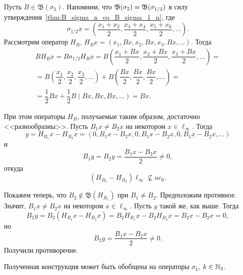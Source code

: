 \begin{example}
	Пусть $B\in\mathfrak B(\sigma_2)$.
	Напомним, что $\mathfrak{B}(\sigma_2) = \mathfrak{B}(\sigma_{1/2})$ в силу утверждения~\ref{thm:B_sigma_n_eq_B_sigma_1_n}, где
	\begin{equation}
		\sigma_{1/2} x = \left(\dfrac{x_1+x_2}2, \dfrac{x_3+x_4}2, \dfrac{x_5+x_6}2, ...\right)
		.
	\end{equation}
	Рассмотрим оператор $H_B$, $H_Bx = (x_1, Bx, x_2, Bx, x_3, Bx, ...)$.
	Тогда
	\begin{multline}
		B H_B x = B \sigma_{1/2} H_B x = B\left(\dfrac{x_1+Bx}2, \dfrac{x_2+Bx}2, \dfrac{x_3+Bx}2, ...\right) =
		\\=
		B\left(\dfrac{x_1}2, \dfrac{x_2}2, \dfrac{x_3}2, ...\right) + B\left(\dfrac{Bx}2, \dfrac{Bx}2, \dfrac{Bx}2, ...\right)=
		\\=
		\dfrac12 Bx + \dfrac12 B\left(Bx, Bx, Bx, ...\right) = Bx
		.
	\end{multline}

	При этом операторы $H_B$, получаемые таким образом, достаточно <<разнообразны>>.
	Пусть $B_1 x \ne B_2 x$ на некотором $x\in \ell_\infty$.
	Тогда
	\begin{equation}
		y = H_{B_1} x - H_{B_2} x = (0, B_1 x - B_2 x, 0, B_1 x - B_2 x, 0, B_1 x - B_2 x, ...)
	\end{equation}
	 и
	\begin{equation}
		B_1y = B_2y = \dfrac{B_1 x - B_2 x}2\ne 0
		,
	\end{equation}
	откуда
	\begin{equation}
		(H_{B_1} - H_{B_2})\ell_\infty \not\subseteq ac_0
		.
	\end{equation}


	Покажем  теперь, что $B_2 \notin \mathfrak B (H_{B_1})$ при $B_1 \ne B_2$. Предположим противное. Значит, $B_1 x \ne B_2 x$ на некотором $x\in \ell_\infty$. Пусть $y$ такой же, как выше. Тогда
	\begin{equation}
		B_2 y = B_2(H_{B_1} x - H_{B_2} x) = B_2 H_{B_1} x - B_2 H_{B_2} x = B_2 x - B_2 x = 0
		,
	\end{equation}
	но
	\begin{equation}
		B_2 y = \dfrac{B_1x - B_2 x}{2} \ne 0
		.
	\end{equation}
	Получили противоречие.
\end{example}

Полученная конструкция может быть обобщена на операторы $\sigma_k$, $k\in\mathbb{N}_3$.

